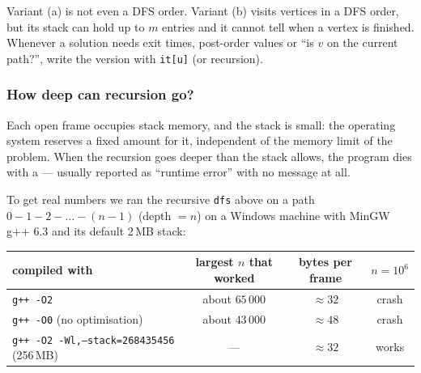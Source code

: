 \begin{warningbox}
Variant (a) is not even a DFS order. Variant (b) visits vertices in a DFS order, but its stack can hold up to $m$ entries and it cannot tell when a vertex is finished. Whenever a solution needs exit times, post-order values or ``is $v$ on the current path?'', write the version with \texttt{it[u]} (or recursion).
\end{warningbox}

\subsubsection*{How deep can recursion go?}

Each open frame occupies stack memory, and the stack is small: the operating system reserves a fixed amount for it, independent of the memory limit of the problem. When the recursion goes deeper than the stack allows, the program dies with a \stackoverflow{} --- usually reported as ``runtime error'' with no message at all.

To get real numbers we ran the recursive \texttt{dfs} above on a path $0 - 1 - 2 - \dots - (n-1)$ (depth $= n$) on a Windows machine with MinGW g++ 6.3 and its default 2\,MB stack:

\begin{center}
\small
\begin{tabular}{@{}lccc@{}}
\toprule
\textbf{compiled with} & \textbf{largest $n$ that worked} & \textbf{bytes per frame} & \textbf{$n = 10^6$} \\
\midrule
\texttt{g++ -O2} & about $65\,000$ & $\approx 32$ & crash \\
\texttt{g++ -O0} (no optimisation) & about $43\,000$ & $\approx 48$ & crash \\
\texttt{g++ -O2 -Wl,--stack=268435456} (256\,MB) & --- & $\approx 32$ & works \\
\bottomrule
\end{tabular}
\end{center}

